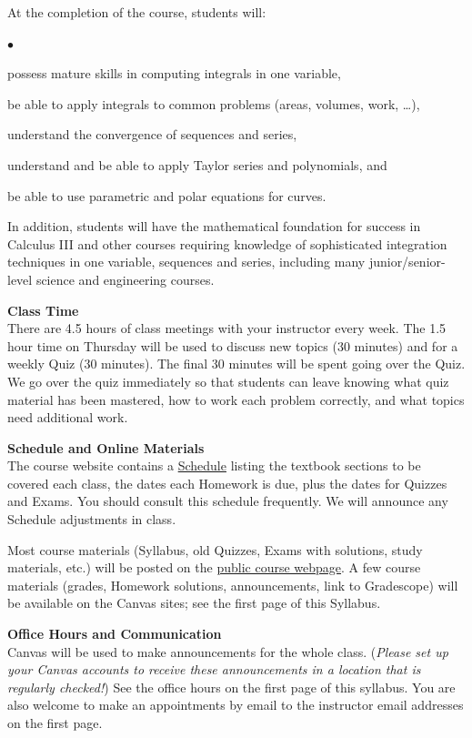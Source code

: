 \documentclass[12pt]{article}
\renewcommand{\emph}[1]{\textsf{\textbf{#1}}}
\newcommand{\localhead}[1]{\par\smallskip\textbf{#1} \smallskip\nobreak\\}%
\def\heading#1{\localhead{\large\emph{#1}}}
\newenvironment{clist}%
{\bgroup\parskip 0pt\begin{list}{$\bullet$}{\partopsep 4pt\topsep 0pt\itemsep -2pt}}%
{\end{list}\egroup}%
\begin{document}
At the completion of the course, students will:
\begin{clist}
\item possess mature skills in computing integrals in one variable,
\item be able to apply integrals to common problems (areas, volumes, work, \dots),
\item understand the convergence of sequences and series,
\item understand and be able to apply Taylor series and polynomials, and
\item be able to use parametric and polar equations for curves.
\end{clist}
In addition, students will have the mathematical foundation for success in Calculus III and other courses requiring knowledge of sophisticated integration techniques in one variable, sequences and series, including many junior/senior-level science and engineering courses.

\clearpage\newpage
\phantom{x}
\vspace{-4mm}

\heading{Class Time}
There are 4.5 hours of class meetings with your instructor every week. The 1.5 hour time on Thursday will be used to discuss new topics (30 minutes) and for a weekly Quiz (30 minutes).  The final 30 minutes will be spent going over the Quiz.  We go over the quiz immediately so that students can leave knowing what quiz material has been mastered, how to work each problem correctly, and what topics need additional work. 

\heading{Schedule and Online Materials}
The course website contains a \href{https://uaf-math.github.io/calc2/assets/general/S26/inperson/schedule.pdf}{Schedule} listing the textbook sections to be covered each class, the dates each Homework is due, plus the dates for Quizzes and Exams. You should consult this schedule frequently.  We will announce any Schedule adjustments in class.

Most course materials (Syllabus, old Quizzes, Exams with solutions, study materials, etc.) will be posted on the \href{https://uaf-math.github.io/calc2/}{public course webpage}.  A few course materials (grades, Homework solutions, announcements, link to Gradescope) will be available on the Canvas sites; see the first page of this Syllabus.

\heading{Office Hours and Communication}
Canvas will be used to make announcements for the whole class.  (\textsl{Please set up your Canvas accounts to receive these announcements in a location that is regularly checked!})  See the office hours on the first page of this syllabus.  You are also welcome to make an appointments by email to the instructor email addresses on the first page.\\
\end{document}

